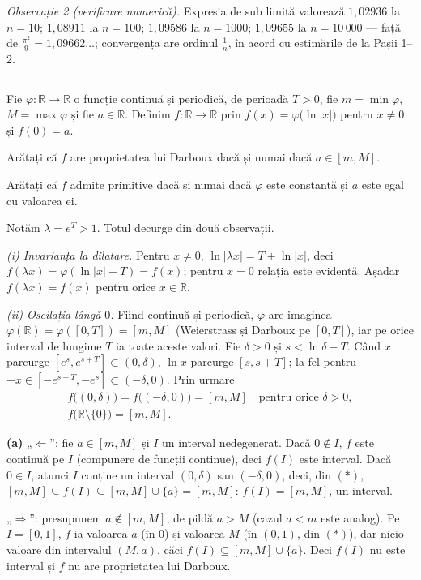 \emph{Observație 2 (verificare numerică).} Expresia de sub limită valorează $1{,}02936$ la $n=10$; $1{,}08911$ la $n=100$; $1{,}09586$ la $n=1000$; $1{,}09655$ la $n=10\,000$ --- față de $\frac{\pi^{2}}{9}=1{,}09662\ldots$; convergența are ordinul $\frac1n$, în acord cu estimările de la Pașii 1--2.
\vspace{1mm}\hrule

Fie $\varphi:\mathbb{R}\to\mathbb{R}$ o funcție continuă și periodică, de perioadă $T>0$,
fie $m=\min\varphi$, $M=\max\varphi$ și fie $a\in\mathbb{R}$. Definim
$f:\mathbb{R}\to\mathbb{R}$ prin $f(x)=\varphi\bigl(\ln|x|\bigr)$ pentru $x\neq0$ și $f(0)=a$.
\begin{parti}
  \item Arătați că $f$ are proprietatea lui Darboux dacă și numai dacă $a\in[m,M]$.
  \item Arătați că $f$ admite primitive dacă și numai dacă $\varphi$ este constantă și
        $a$ este egal cu valoarea ei.
\end{parti}
\sol Notăm $\lambda=e^{T}>1$. Totul decurge din două observații.

\emph{(i) Invarianța la dilatare.} Pentru $x\neq0$, $\ln|\lambda x|=T+\ln|x|$, deci $f(\lambda x)=\varphi(\ln|x|+T)=f(x)$; pentru $x=0$ relația este evidentă. Așadar $f(\lambda x)=f(x)$ pentru orice $x\in\mathbb{R}$.

\emph{(ii) Oscilația lângă $0$.} Fiind continuă și periodică, $\varphi$ are imaginea $\varphi(\mathbb{R})=\varphi([0,T])=[m,M]$ (Weierstrass și Darboux pe $[0,T]$), iar pe orice interval de lungime $T$ ia toate aceste valori. Fie $\delta>0$ și $s<\ln\delta-T$. Când $x$ parcurge $[e^{s},e^{s+T}]\subset(0,\delta)$, $\ln x$ parcurge $[s,s+T]$; la fel pentru $-x\in[-e^{s+T},-e^{s}]\subset(-\delta,0)$. Prin urmare
\[ \begin{gathered} f\bigl((0,\delta)\bigr)=f\bigl((-\delta,0)\bigr)=[m,M]\quad\text{pentru orice }\delta>0,\\ f\bigl(\mathbb{R}\setminus\{0\}\bigr)=[m,M] . \end{gathered} \tag{$\ast$} \]

\textbf{(a)} „$\Leftarrow$'': fie $a\in[m,M]$ și $I$ un interval nedegenerat. Dacă $0\notin I$, $f$ este continuă pe $I$ (compunere de funcții continue), deci $f(I)$ este interval. Dacă $0\in I$, atunci $I$ conține un interval $(0,\delta)$ sau $(-\delta,0)$, deci, din $(\ast)$, $[m,M]\subseteq f(I)\subseteq[m,M]\cup\{a\}=[m,M]$: $f(I)=[m,M]$, un interval.

„$\Rightarrow$'': presupunem $a\notin[m,M]$, de pildă $a>M$ (cazul $a<m$ este analog). Pe $I=[0,1]$, $f$ ia valoarea $a$ (în $0$) și valoarea $M$ (în $(0,1)$, din $(\ast)$), dar nicio valoare din intervalul $(M,a)$, căci $f(I)\subseteq[m,M]\cup\{a\}$. Deci $f(I)$ nu este interval și $f$ nu are proprietatea lui Darboux.

